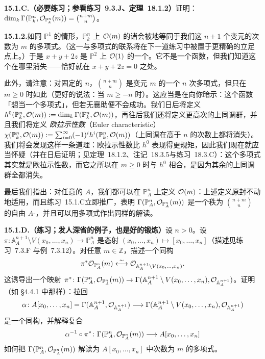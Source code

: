 \textbf{15.1.C.（必要练习；参看\mbox{练习~9.3.J}、\mbox{定理~18.1.2}）}\quad 证明：$\dim_k\Gamma(\mathbb{P}^n_k,\mathcal{O}_{\mathbb{P}^n_k}(m))=\binom{n+m}{n}$。

\textbf{15.1.2.}\quad 如同 $\mathbb{P}^1$ 的情形，$\mathbb{P}^n_k$ 上 $\mathcal{O}(m)$ 的诸\trSection{}会被\trNatural{}地等同于我们这 $n+1$ 个变元的次数为 $m$ 的\trHomogeneous{}多项式。（这一与\trHomogeneous{}多项式的联系将在下一道练习中被置于更精确的立足点上。）于是 $x+y+2z$ 是 $\mathbb{P}^2$ 上 $\mathcal{O}(1)$ 的一个\trSection。它不是一个函数，但我们知道这个\trSection{}在哪里消失——恰好就在 $x+y+2z=0$ 之处。

此外，请注意：对固定的 $n$，$\binom{n+m}{n}$ 是变元 $m$ 的一个 $n$ 次多项式，但只在 $m\ge 0$ 时如此（更好的说法：当 $m\ge -n$ 时）。这应当是在向你暗示：这个函数「想当一个多项式」，但若无襄助便不会成功。我们日后将定义 $h^0(\mathbb{P}^n_k,\mathcal{O}(m)):=\dim_k\Gamma(\mathbb{P}^n_k,\mathcal{O}(m))$，再往后我们还将定义更高次的上同调群，并且我们将定义 \emph{欧拉示性数}（Euler characteristic）$\chi(\mathbb{P}^n_k,\mathcal{O}(m)):=\sum_{i=0}^{\infty}(-1)^i h^i(\mathbb{P}^n_k,\mathcal{O}(m))$（上同调在高于 $n$ 的次数上都将消失）。我们将会发现这样一条道理：欧拉示性数比 $h^0$ 表现得更规矩，因此我们现在就应当怀疑（并在日后证明；见\mbox{定理~18.1.2}、\mbox{注记~18.3.5}与\mbox{练习~18.3.C}）：这个多项式其实就是欧拉示性数，而它之所以在 $m\ge 0$ 时与 $h^0$ 相合，是因为其余的上同调群全都消失。

最后我们指出：对任意的\trRing{} $A$，我们都可以在 $\mathbb{P}^n_A$ 上定义 $\mathcal{O}(m)$：上述定义原封不动地适用，而且\mbox{练习~15.1.C}立即推广，表明 $\Gamma(\mathbb{P}^n_A,\mathcal{O}_{\mathbb{P}^n_A}(m))$ 是一个秩为 $\binom{n+m}{n}$ 的自由 $A$-\trModule，并且可以用\trHomogeneous{}多项式作出同样的解读。

\textbf{15.1.D.（练习；发人深省的例子，也是好的锻炼）}\quad 设 $n>0$。设 $\pi\colon\mathbb{A}^{n+1}_A\setminus V(x_0,\dots,x_n)\to\mathbb{P}^n_A$ 是态射 $(x_0,\dots,x_n)\mapsto[x_0,\dots,x_n]$（描述见练习~7.3.F 与例~7.3.12）。对任意 $m\in\mathbb{Z}$，描述一个同构
\[
\pi^*\mathcal{O}_{\mathbb{P}^n_A}(m)\overset{\sim}{\longleftrightarrow}\mathcal{O}_{\mathbb{A}^{n+1}_A\setminus V(x_0,\dots,x_n)}.
\]
这诱导出一个映射 $\pi^*\colon\Gamma(\mathbb{P}^n_A,\mathcal{O}_{\mathbb{P}^n_A}(m))\to\Gamma(\mathbb{A}^{n+1}_A\setminus V(x_0,\dots,x_n),\mathcal{O}_{\mathbb{A}^{n+1}_A})$。证明（如 \S4.4.1 中那样）：拉回
\[
\alpha\colon A[x_0,\dots,x_n]=\Gamma(\mathbb{A}^{n+1}_A,\mathcal{O}_{\mathbb{A}^{n+1}_A})\longrightarrow\Gamma(\mathbb{A}^{n+1}_A\setminus V(x_0,\dots,x_n),\mathcal{O}_{\mathbb{A}^{n+1}_A})
\]
是一个同构，并解释复合
\[
\alpha^{-1}\circ\pi^*\colon\Gamma(\mathbb{P}^n_A,\mathcal{O}_{\mathbb{P}^n_A}(m))\longrightarrow A[x_0,\dots,x_n]
\]
如何把 $\Gamma(\mathbb{P}^n_A,\mathcal{O}_{\mathbb{P}^n_A}(m))$ 解读为 $A[x_0,\dots,x_n]$ 中次数为 $m$ 的\trHomogeneous{}多项式。

